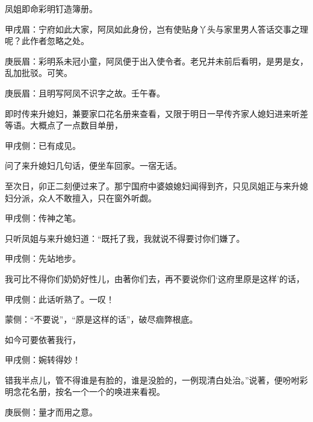 \begin{parag}
    凤姐即命彩明钉造簿册。\begin{note}甲戌眉：宁府如此大家，阿凤如此身份，岂有使贴身丫头与家里男人答话交事之理呢？此作者忽略之处。\end{note}\begin{note}庚辰眉：彩明系未冠小童，阿凤便于出入使令者。老兄并未前后看明，是男是女，乱加批驳。可笑。\end{note}\begin{note}庚辰眉：且明写阿凤不识字之故。壬午春。\end{note}即时传来升媳妇，兼要家口花名册来查看，又限于明日一早传齐家人媳妇进来听差等语。大概点了一点数目单册，\begin{note}甲戌侧：已有成见。\end{note}问了来升媳妇几句话，便坐车回家。一宿无话。
\end{parag}


\begin{parag}
    至次日，卯正二刻便过来了。那宁国府中婆娘媳妇闻得到齐，只见凤姐正与来升媳妇分派，众人不敢擅入，只在窗外听觑。\begin{note}甲戌侧：传神之笔。\end{note}只听凤姐与来升媳妇道：“既托了我，我就说不得要讨你们嫌了。\begin{note}甲戌侧：先站地步。\end{note}我可比不得你们奶奶好性儿，由著你们去，再不要说你们‘这府里原是这样’的话，\begin{note}甲戌侧：此话听熟了。一叹！\end{note}\begin{note}蒙侧：“不要说”，“原是这样的话”，破尽痼弊根底。\end{note}如今可要依著我行，\begin{note}甲戌侧：婉转得妙！\end{note}错我半点儿，管不得谁是有脸的，谁是没脸的，一例现清白处治。”说著，便吩咐彩明念花名册，按名一个一个的唤进来看视。\begin{note}庚辰侧：量才而用之意。\end{note}
\end{parag}


